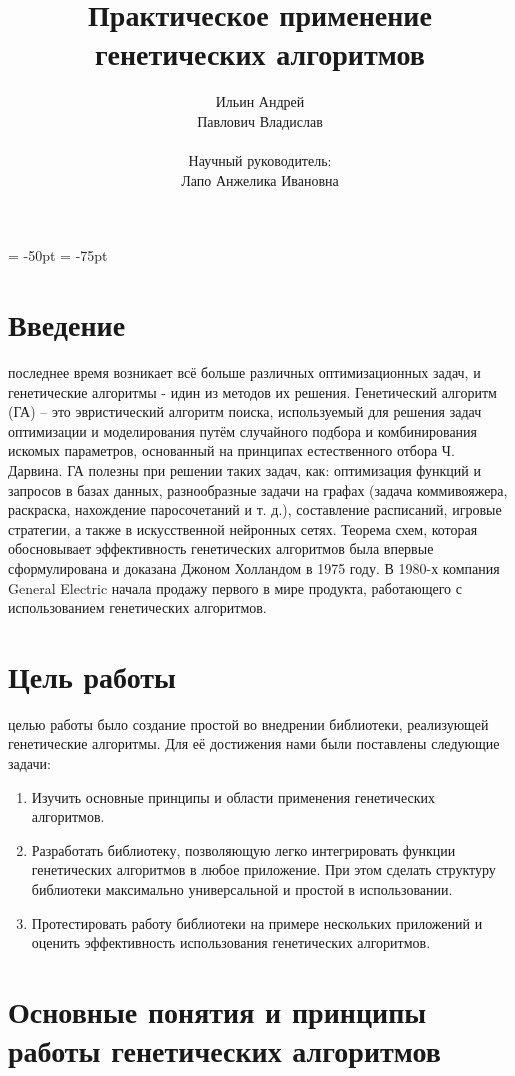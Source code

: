 \documentclass[a4paper, oneside, 11pt]{article}
\title{\textbf{Практическое применение генетических алгоритмов}}
\author{Ильин Андрей\\Павлович Владислав\\\\Научный руководитель:\\ Лапо Анжелика Ивановна\\}
\date{}
\begin{document}
\newpage
\hoffset = -50pt
\voffset = -75pt
\maketitle
\newpage

\tableofcontents
\newpage
\parindent=1cm

\section{Введение}
\indent{} последнее время возникает всё больше различных оптимизационных задач, и генетические алгоритмы - идин из методов их решения. Генетический алгоритм (ГА) – это эвристический алгоритм поиска, используемый для решения задач оптимизации и моделирования путём случайного подбора и комбинирования искомых параметров, основанный на принципах естественного отбора Ч. Дарвина. ГА полезны при решении таких задач, как:  оптимизация функций и запросов в базах данных, разнообразные задачи на графах (задача коммивояжера, раскраска, нахождение паросочетаний и т. д.),  составление расписаний, игровые стратегии, а также в искусственной нейронных сетях. Теорема схем, которая обосновывает эффективность генетических алгоритмов была впервые сформулирована и доказана Джоном Холландом в 1975 году. В 1980-х компания 
General Electric начала продажу первого в мире продукта, работающего с использованием генетических алгоритмов.

\section{Цель работы}
\indent{} целью работы было создание простой во внедрении библиотеки, реализующей генетические алгоритмы. Для её достижения нами были поставлены следующие задачи:
\begin{enumerate}
\item Изучить основные принципы и области применения генетических алгоритмов.
\item Разработать  библиотеку, позволяющую легко интегрировать функции генетических алгоритмов в любое приложение. При этом сделать структуру библиотеки максимально универсальной и простой в использовании.
\item Протестировать работу библиотеки на примере нескольких приложений и оценить эффективность использования генетических алгоритмов.
\end{enumerate}

\section{Основные понятия и принципы работы генетических алгоритмов}
\end{document}
